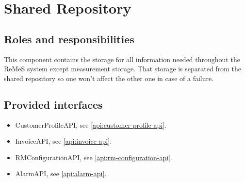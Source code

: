 \section{Shared Repository}
\label{element:shared-repository}

\subsection{Roles and responsibilities}

\npar This component contains the storage for all information needed throughout
the ReMeS system except measurement storage. That storage is separated from the
shared repository so one won't affect the other one in case of a failure.

\subsection{Provided interfaces}

\begin{itemize}
  \item CustomerProfileAPI, see \ref{api:customer-profile-api}.
  \item InvoiceAPI, see \ref{api:invoice-api}.
  \item RMConfigurationAPI, see \ref{api:rm-configuration-api}.
  \item AlarmAPI, see \ref{api:alarm-api}.
\end{itemize}